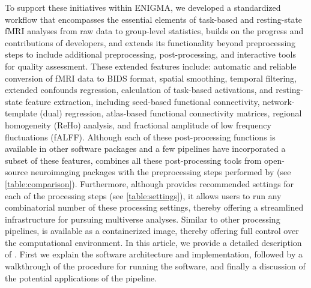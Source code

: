 To support these initiatives within ENIGMA, we developed a standardized
workflow that encompasses the essential elements of task-based and
resting-state fMRI analyses from raw data to group-level statistics, builds
on the progress and contributions of  developers, and
extends its functionality beyond preprocessing steps to include additional
preprocessing, post-processing, and interactive tools for quality
assessment. These extended features include: automatic and reliable
conversion of fMRI data to BIDS format, spatial smoothing, temporal
filtering, extended confounds regression, calculation of task-based
activations, and resting-state feature extraction, including seed-based
functional connectivity, network-template (dual) regression, atlas-based
functional connectivity matrices, regional homogeneity (ReHo) analysis, and
fractional amplitude of low frequency fluctuations (fALFF). Although each
of these post-processing functions is available in other software packages
and a few pipelines have incorporated a subset of these features,
 combines all these post-processing tools from open-source
neuroimaging packages with the preprocessing steps performed by
 (see \autoref{table:comparison}). Furthermore, although
 provides recommended settings for each of the processing
steps (see \autoref{table:settings}), it allows users to run any combinatorial
number of these processing settings, thereby offering a streamlined
infrastructure for pursuing multiverse analyses. Similar to other
processing pipelines,  is available as a containerized
image, thereby offering full control over the computational environment.
In this article, we provide a detailed description of . 
First we explain the software architecture and implementation, followed by
a walkthrough of the procedure for running the software, and finally a 
discussion of the potential applications of the pipeline.
